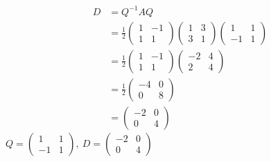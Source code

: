 \documentclass[13pt]{article}
\begin{document}
\begin{enumerate}[label=(\alph*),leftmargin=*]
  \begin{align*}
    D &= Q^{-1}AQ \\
      &= \frac{1}{2}
        \begin{pmatrix}
          1 & -1 \\
          1 & 1
        \end{pmatrix}
        \begin{pmatrix}
          1 & 3 \\
          3 & 1
        \end{pmatrix}
        \begin{pmatrix}
          1 & 1 \\
          -1 & 1
        \end{pmatrix} \\
      &= \frac{1}{2}
        \begin{pmatrix}
          1 & -1 \\
          1 & 1
        \end{pmatrix}
        \begin{pmatrix}
          -2 & 4 \\
          2 & 4
        \end{pmatrix} \\
      &= \frac{1}{2}
        \begin{pmatrix}
          -4 & 0 \\
          0 & 8
        \end{pmatrix} \\
      &=
        \begin{pmatrix}
          -2 & 0 \\
          0 & 4
        \end{pmatrix}
  \end{align*}
  $Q =
  \begin{pmatrix}
    1 & 1 \\
    -1 & 1
  \end{pmatrix}, \ D =
  \begin{pmatrix}
    -2 & 0 \\
    0 & 4
  \end{pmatrix}$


\end{enumerate}
\end{document}
